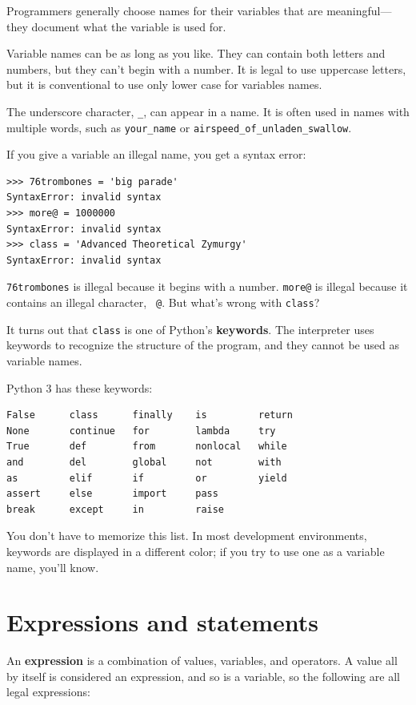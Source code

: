 \documentclass[10pt]{book}
\begin{document}
Programmers generally choose names for their variables that
are meaningful---they document what the variable is used for.

Variable names can be as long as you like.  They can contain
both letters and numbers, but they can't begin with a number.
It is legal to use uppercase letters, but it is conventional
to use only lower case for variables names.

The underscore character, \verb"_", can appear in a name.
It is often used in names with multiple words, such as
\verb"your_name" or \verb"airspeed_of_unladen_swallow".

If you give a variable an illegal name, you get a syntax error:

\begin{verbatim}
>>> 76trombones = 'big parade'
SyntaxError: invalid syntax
>>> more@ = 1000000
SyntaxError: invalid syntax
>>> class = 'Advanced Theoretical Zymurgy'
SyntaxError: invalid syntax
\end{verbatim}
%
{\tt 76trombones} is illegal because it begins with a number.
{\tt more@} is illegal because it contains an illegal character, {\tt
@}.  But what's wrong with {\tt class}?

It turns out that {\tt class} is one of Python's {\bf keywords}.  The
interpreter uses keywords to recognize the structure of the program,
and they cannot be used as variable names.

Python 3 has these keywords:

\begin{verbatim}
False      class      finally    is         return
None       continue   for        lambda     try
True       def        from       nonlocal   while
and        del        global     not        with
as         elif       if         or         yield
assert     else       import     pass
break      except     in         raise
\end{verbatim}
%
You don't have to memorize this list.  In most development environments,
keywords are displayed in a different color; if you try to use one
as a variable name, you'll know.


\section{Expressions and statements}

An {\bf expression} is a combination of values, variables, and operators.
A value all by itself is considered an expression, and so is
a variable, so the following are all legal expressions:
\end{document}
